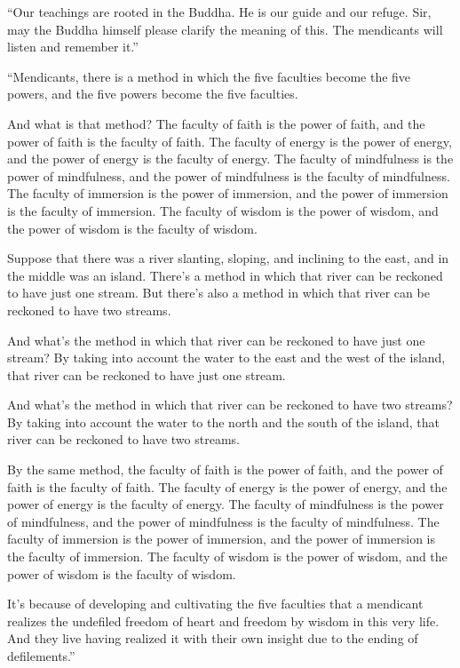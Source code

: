 \documentclass[12pt,openany]{book}%
\begin{document}
“Our teachings are rooted in the Buddha. He is our guide and our refuge. Sir, may the Buddha himself please clarify the meaning of this. The mendicants will listen and remember it.” 

“Mendicants, there is a method in which the five faculties become the five powers, and the five powers become the five faculties. 

And what is that method? The faculty of faith is the power of faith, and the power of faith is the faculty of faith. The faculty of energy is the power of energy, and the power of energy is the faculty of energy. The faculty of mindfulness is the power of mindfulness, and the power of mindfulness is the faculty of mindfulness. The faculty of immersion is the power of immersion, and the power of immersion is the faculty of immersion. The faculty of wisdom is the power of wisdom, and the power of wisdom is the faculty of wisdom. 

Suppose that there was a river slanting, sloping, and inclining to the east, and in the middle was an island. There’s a method in which that river can be reckoned to have just one stream. But there’s also a method in which that river can be reckoned to have two streams. 

And what’s the method in which that river can be reckoned to have just one stream? By taking into account the water to the east and the west of the island, that river can be reckoned to have just one stream. 

And what’s the method in which that river can be reckoned to have two streams? By taking into account the water to the north and the south of the island, that river can be reckoned to have two streams. 

By the same method, the faculty of faith is the power of faith, and the power of faith is the faculty of faith. The faculty of energy is the power of energy, and the power of energy is the faculty of energy. The faculty of mindfulness is the power of mindfulness, and the power of mindfulness is the faculty of mindfulness. The faculty of immersion is the power of immersion, and the power of immersion is the faculty of immersion. The faculty of wisdom is the power of wisdom, and the power of wisdom is the faculty of wisdom. 

It’s because of developing and cultivating the five faculties that a mendicant realizes the undefiled freedom of heart and freedom by wisdom in this very life. And they live having realized it with their own insight due to the ending of defilements.” 
\end{document}
